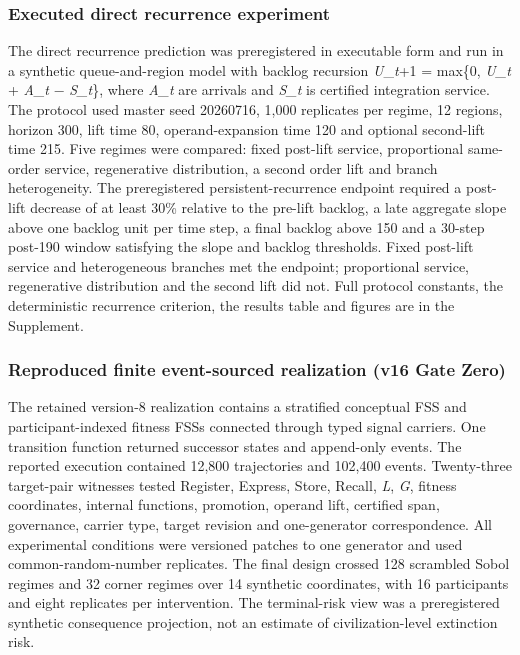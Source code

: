 \hypertarget{executed-direct-recurrence-experiment}{%
\subsubsection{Executed direct recurrence
experiment}\label{executed-direct-recurrence-experiment}}

The direct recurrence prediction was preregistered in executable form
and run in a synthetic queue-and-region model with backlog recursion
\emph{U}\_\emph{t}+1 = max\{0, \emph{U\_t} + \emph{A\_t} −
\emph{S\_t}\}, where \emph{A\_t} are arrivals and \emph{S\_t} is
certified integration service. The protocol used master seed 20260716,
1,000 replicates per regime, 12 regions, horizon 300, lift time 80,
operand-expansion time 120 and optional second-lift time 215. Five
regimes were compared: fixed post-lift service, proportional same-order
service, regenerative distribution, a second order lift and branch
heterogeneity. The preregistered persistent-recurrence endpoint required
a post-lift decrease of at least 30\% relative to the pre-lift backlog,
a late aggregate slope above one backlog unit per time step, a final
backlog above 150 and a 30-step post-190 window satisfying the slope and
backlog thresholds. Fixed post-lift service and heterogeneous branches
met the endpoint; proportional service, regenerative distribution and
the second lift did not. Full protocol constants, the deterministic
recurrence criterion, the results table and figures are in the
Supplement.

\hypertarget{reproduced-finite-event-sourced-realization-v16-gate-zero}{%
\subsubsection{Reproduced finite event-sourced realization (v16 Gate
Zero)}\label{reproduced-finite-event-sourced-realization-v16-gate-zero}}

The retained version-8 realization contains a stratified conceptual FSS
and participant-indexed fitness FSSs connected through typed signal
carriers. One transition function returned successor states and
append-only events. The reported execution contained 12,800 trajectories
and 102,400 events. Twenty-three target-pair witnesses tested Register,
Express, Store, Recall, \emph{L}, \emph{G}, fitness coordinates,
internal functions, promotion, operand lift, certified span, governance,
carrier type, target revision and one-generator correspondence. All
experimental conditions were versioned patches to one generator and used
common-random-number replicates. The final design crossed 128 scrambled
Sobol regimes and 32 corner regimes over 14 synthetic coordinates, with
16 participants and eight replicates per intervention. The terminal-risk
view was a preregistered synthetic consequence projection, not an
estimate of civilization-level extinction risk.

